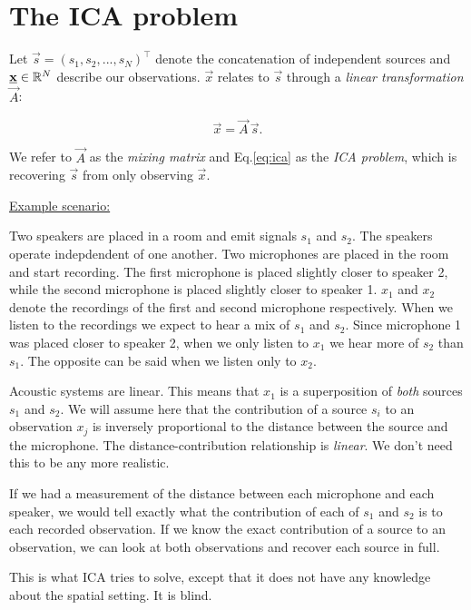 
\section{The ICA problem}

Let $\vec s = (s_1, s_2,...,s_N)^\top$ denote the concatenation of independent sources 
and $\underline{\mathbf{x}} \in \mathbb{R}^N$ describe our observations. $\vec x$ relates to $\vec s$ through a 
\emph{linear transformation} $\vec A$:

\begin{equation}
\label{eq:ica}
\vec x = \vec A \, \vec s.
\end{equation}

We refer to $\vec A$ as the \emph{mixing matrix} and Eq.\ref{eq:ica} as the \emph{ICA problem}, 
which is recovering $\vec s$ from only observing $\vec x$.

\underline{Example scenario:}

Two speakers are placed in a room and emit signals $s_1$ and $s_2$. 
The speakers operate indepdendent of one another.  
Two microphones are placed in the room and start recording. 
The first microphone is placed slightly closer to speaker 2, while 
the second microphone is placed slightly closer to speaker 1.
$x_1$ and $x_2$ denote the recordings of the first and second microphone respectively. 
When we listen to the recordings we expect to hear a mix of $s_1$ and $s_2$. 
Since microphone 1 was placed closer to speaker 2, when we only listen to $x_1$ we hear more of $s_2$ than $s_1$. 
The opposite can be said when we listen only to $x_2$.

Acoustic systems are linear. This means that $x_1$ is a superposition of \emph{both} sources $s_1$ and $s_2$. 
We will assume here that the contribution of a source $s_i$ 
to an observation $x_j$ is inversely proportional to the distance between the source and the microphone. 
The distance-contribution relationship is \emph{linear}. We don't need this to be any more realistic. 

If we had a measurement of the distance between each microphone and each speaker, 
we would tell exactly what the contribution of each of $s_1$ and $s_2$ is to each recorded observation. 
If we know the exact contribution of a source to an observation, we can look at both observations and recover each source in full.

This is what ICA tries to solve, except that it does not have any knowledge about the spatial setting. It is blind.
